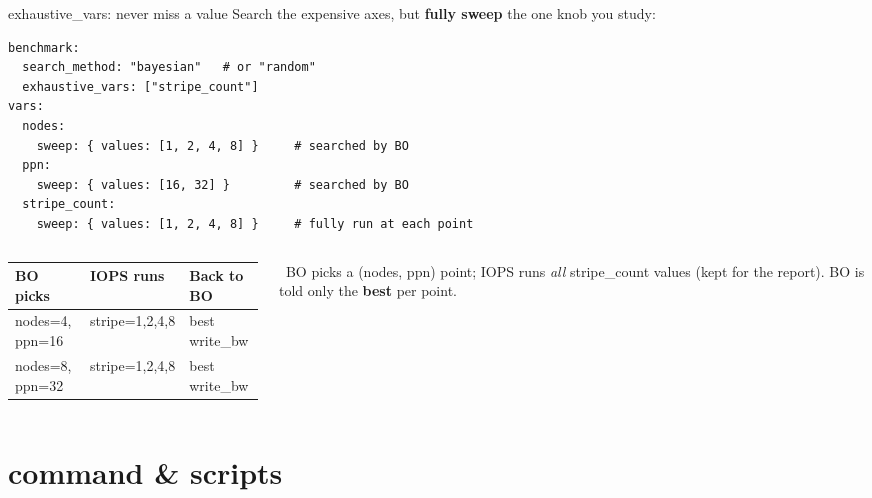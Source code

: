 \documentclass[aspectratio=169,11pt]{beamer}
\newcommand{\code}[1]{{\ttfamily\small\color{iopsNavy}#1}}
\newcommand{\hl}[1]{{\color{iopsPink}\bfseries #1}}
\begin{document}
\begin{frame}[fragile]{exhaustive\_vars: never miss a value}
  Search the expensive axes, but \hl{fully sweep} the one knob you study:
\begin{lstlisting}[style=yaml,basicstyle=\ttfamily\fontsize{7.7}{9.2}\selectfont,columns=fixed]
benchmark:
  search_method: "bayesian"   # or "random"
  exhaustive_vars: ["stripe_count"]
vars:
  nodes:
    sweep: { values: [1, 2, 4, 8] }     # searched by BO
  ppn:
    sweep: { values: [16, 32] }         # searched by BO
  stripe_count:
    sweep: { values: [1, 2, 4, 8] }     # fully run at each point
\end{lstlisting}
  \vspace{0.4em}
  \begin{columns}[c]
    \begin{column}{0.5\textwidth}
      \footnotesize
      \begin{tabular}{@{}lll@{}}
        \toprule
        \textbf{BO picks} & \textbf{IOPS runs} & \textbf{Back to BO} \\
        \midrule
        \rowcolor{iopsCyan!10}
        nodes=4, ppn=16 & stripe=1,2,4,8 & best write\_bw \\
        nodes=8, ppn=32 & stripe=1,2,4,8 & best write\_bw \\
        \bottomrule
      \end{tabular}
    \end{column}
    \begin{column}{0.5\textwidth}
      \begin{keybox}[colback=iopsGreen!10, colframe=iopsGreen]
        \faCogs~BO picks a \code{(nodes, ppn)} point; IOPS runs \emph{all}
        \code{stripe\_count} values (kept for the report). BO is told only the
        \hl{best} per point.
      \end{keybox}
    \end{column}
  \end{columns}
\end{frame}

\section{command \& scripts}
\end{document}
